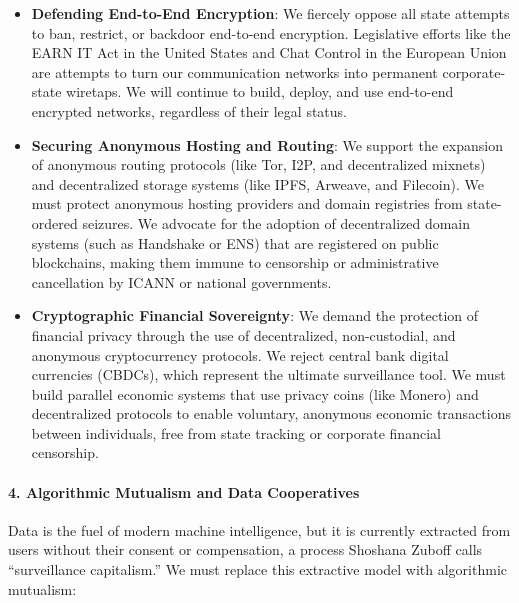 \begin{itemize}
\tightlist
\item
  \textbf{Defending End-to-End Encryption}: We fiercely oppose all state
  attempts to ban, restrict, or backdoor end-to-end encryption.
  Legislative efforts like the EARN IT Act in the United States and Chat
  Control in the European Union are attempts to turn our communication
  networks into permanent corporate-state wiretaps. We will continue to
  build, deploy, and use end-to-end encrypted networks, regardless of
  their legal status.
\item
  \textbf{Securing Anonymous Hosting and Routing}: We support the
  expansion of anonymous routing protocols (like Tor, I2P, and
  decentralized mixnets) and decentralized storage systems (like IPFS,
  Arweave, and Filecoin). We must protect anonymous hosting providers
  and domain registries from state-ordered seizures. We advocate for the
  adoption of decentralized domain systems (such as Handshake or ENS)
  that are registered on public blockchains, making them immune to
  censorship or administrative cancellation by ICANN or national
  governments.
\item
  \textbf{Cryptographic Financial Sovereignty}: We demand the protection
  of financial privacy through the use of decentralized, non-custodial,
  and anonymous cryptocurrency protocols. We reject central bank digital
  currencies (CBDCs), which represent the ultimate surveillance tool. We
  must build parallel economic systems that use privacy coins (like
  Monero) and decentralized protocols to enable voluntary, anonymous
  economic transactions between individuals, free from state tracking or
  corporate financial censorship.
\end{itemize}

\paragraph{4. Algorithmic Mutualism and Data
Cooperatives}\label{algorithmic-mutualism-and-data-cooperatives}

Data is the fuel of modern machine intelligence, but it is currently
extracted from users without their consent or compensation, a process
Shoshana Zuboff calls ``surveillance capitalism.'' We must replace this
extractive model with algorithmic mutualism:

